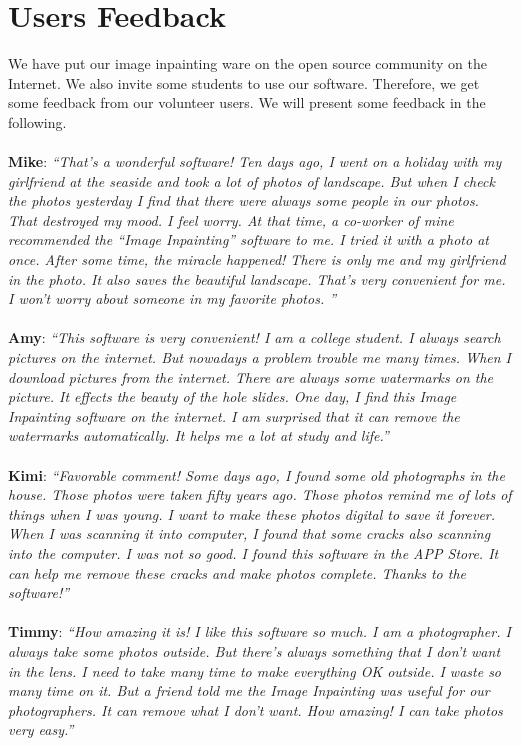 \section{Users Feedback}
\qquad We have put our image inpainting ware on the open source community on the Internet. We also invite some students to use our software. Therefore, we get some feedback from our volunteer users. We will present some feedback in the following. \\ \ \\
\textbf{Mike}: \emph{``That's a wonderful software! Ten days ago, I went on a holiday with my girlfriend at the seaside and took a lot of photos of landscape. But when I check the photos yesterday I find that there were always some people in our photos. That destroyed my mood. I feel worry. At that time, a co-worker of mine recommended the ``Image Inpainting'' software to me. I tried it with a photo at once. After some time, the miracle happened! There is only me and my girlfriend in the photo. It also saves the beautiful landscape. That's very convenient for me. I won’t worry about someone in my favorite photos. ''}\\ \\
\textbf{Amy}: \emph{``This software is very convenient! I am a college student. I always search pictures on the internet. But nowadays a problem trouble me many times. When I download pictures from the internet. There are always some watermarks on the picture. It effects the beauty of the hole slides. One day, I find this Image Inpainting software on the internet. I am surprised that it can remove the watermarks automatically. It helps me a lot at study and life.''} \\ \\
\textbf{Kimi}: \emph{``Favorable comment! Some days ago, I found some old photographs in the house. Those photos were taken fifty years ago. Those photos remind me of lots of things when I was young. I want to make these photos digital to save it forever. When I was scanning it into computer, I found that some cracks also scanning into the computer. I was not so good. I found this software in the APP Store. It can help me remove these cracks and make photos complete. Thanks to the software!''}\\ \\
\textbf{Timmy}: \emph{``How amazing it is! I like this software so much. I am a photographer. I always take some photos outside. But there’s always something that I don’t want in the lens. I need to take many time to make everything OK outside. I waste so many time on it. But a friend told me the Image Inpainting was useful for our photographers. It can remove what I don’t want. How amazing! I can take photos very easy.''}


